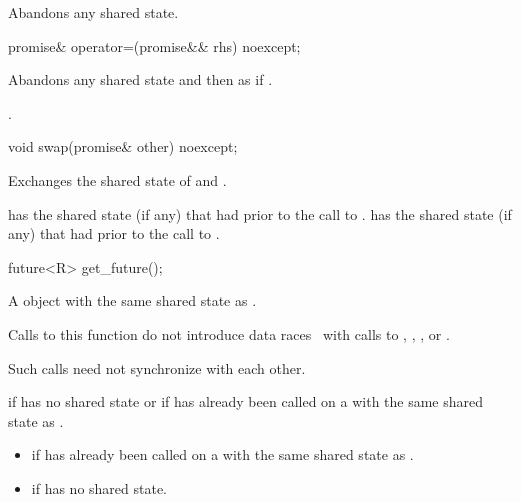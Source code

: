 \begin{itemdescr}
\pnum
\effects
Abandons any shared state.
\end{itemdescr}

%
\begin{itemdecl}
promise& operator=(promise&& rhs) noexcept;
\end{itemdecl}

\begin{itemdescr}
\pnum
\effects
Abandons any shared state and then as if
.

\pnum
\returns
{}.
\end{itemdescr}

%
\begin{itemdecl}
void swap(promise& other) noexcept;
\end{itemdecl}

\begin{itemdescr}
\pnum
\effects
Exchanges the shared state of  and .

\pnum
\ensures
{} has the shared state (if any) that  had
prior to the call to .  has the shared state (if any) that
 had prior to the call to .
\end{itemdescr}

%
\begin{itemdecl}
future<R> get_future();
\end{itemdecl}

\begin{itemdescr}
\pnum
\returns
A  object with the same shared state as
.

\pnum
\sync
Calls to this function do not introduce
data races~ with calls to
,
,
, or
.
\begin{note}
Such calls need not synchronize with each other.
\end{note}

\pnum
\throws
{} if  has no shared state or if
 has already been called on a  with the same
shared state as .

\pnum
\errors

\begin{itemize}
\item {} if  has already been called on
a  with the same shared state as .

\item {} if  has no shared state.
\end{itemize}
\end{itemdescr}

